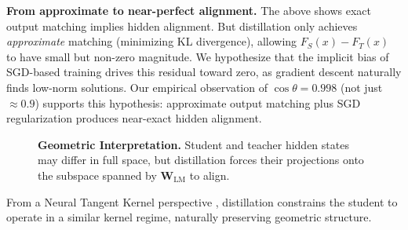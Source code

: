 \documentclass[10pt]{article} %
\theoremstyle{plain}
\theoremstyle{definition}
\theoremstyle{remark}
\begin{document}
\noindent\textbf{From approximate to near-perfect alignment.}
The above shows exact output matching implies hidden alignment. But distillation only achieves \textit{approximate} matching (minimizing KL divergence), allowing $F_S(x) - F_T(x)$ to have small but non-zero magnitude. We hypothesize that the implicit bias of SGD-based training \cite{jacot2018neural} drives this residual toward zero, as gradient descent naturally finds low-norm solutions. Our empirical observation of $\cos \theta = 0.998$ (not just $\approx 0.9$) supports this hypothesis: approximate output matching plus SGD regularization produces near-exact hidden alignment.

\begin{figure}[htbp]
    \centering
    \caption{\textbf{Geometric Interpretation.} Student and teacher hidden states may differ in full space, but distillation forces their projections onto the subspace spanned by $\mathbf{W}_{\text{LM}}$ to align.}
    \label{fig:subspace_diagram}
\end{figure}

From a Neural Tangent Kernel perspective \cite{jacot2018neural}, distillation constrains the student to operate in a similar kernel regime, naturally preserving geometric structure.
\end{document}
